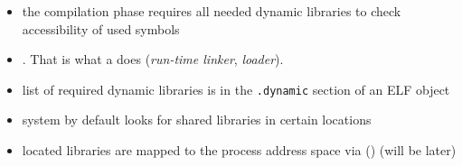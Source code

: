 

\begin{slide}

\begin{itemize}
\item the compilation phase requires all needed dynamic libraries to check
accessibility of used symbols
\item {}. That is what a  does  (\emph{run-time
linker}, \emph{loader}).
\item list of required dynamic libraries is in the \texttt{.dynamic} section of
an ELF object
\item system by default looks for shared libraries in certain locations
\item located libraries are mapped to the process address space via
() (will be later)
\end{itemize}
\end{slide}

\label{RUNTIMELINKER}

